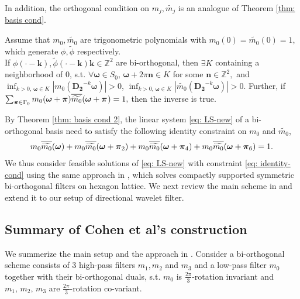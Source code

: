 In addition, the orthogonal condition on $m_j,\widetilde{m_j}$ is an analogue of Theorem \ref{thm: basis cond}.
\begin{thm}\label{thm: basis cond 2}
Assume that $m_0, \widetilde{m_0}$ are trigonometric polynomials with $m_0(0)=\widetilde{m_0}(0) = 1$, which generate $\phi,\widetilde{\phi}$ respectively.\\
If $\phi(\cdot - \boldsymbol{k}),\widetilde{\phi}(\cdot - \boldsymbol{k})\boldsymbol{k}\in\mathbb{Z}^2$ are bi-orthogonal, then $\exists K$ containing a neighborhood of 0, s.t. $\forall\boldsymbol{\omega}\in S_0,\,\boldsymbol{\omega}+2\pi\mathbf{n}\in K$ for some $\mathbf{n}\in\mathbb{Z}^2, $ and $\inf_{k>0,\,\boldsymbol{\omega}\in K}|m_0(\mathbf{D_2}^{-k}\boldsymbol{\omega})| >0$, $\inf_{k>0,\,\boldsymbol{\omega}\in K}|\widetilde{m_0}(\mathbf{D_2}^{-k}\boldsymbol{\omega})| >0$. 
 Further, if  $\sum_{\boldsymbol{\boldsymbol{\pi}}\in \Gamma_0} m_0(\boldsymbol{\omega}+\boldsymbol{\pi})\overline{\widetilde{m_{0}}}(\boldsymbol{\omega} + \boldsymbol{\pi}_{}) = 1,$ then the inverse is true.
\end{thm}
By Theorem \ref{thm: basis cond 2}, the linear system \eqref{eq: LS-new} of a bi-orthogonal basis need to satisfy the following identity constraint on $m_0$ and $\widetilde{m_0}$,
\begin{align}\label{eq: identity-cond}
m_0\overline{\widetilde{m_{0}}}(\boldsymbol{\omega}) + m_0\overline{\widetilde{m_{0}}}(\boldsymbol{\omega} + \boldsymbol{\pi}_{2}) + m_0\overline{\widetilde{m_{0}}}(\boldsymbol{\omega} + \boldsymbol{\pi}_{4}) + m_0\overline{\widetilde{m_{0}}}(\boldsymbol{\omega} + \boldsymbol{\pi}_{6}) = 1.
\end{align}
We thus consider feasible solutions of \eqref{eq: LS-new} with constraint \eqref{eq: identity-cond} using the same approach in \cite{cohen1993compactly}, which solves compactly supported symmetric bi-orthogonal filters on hexagon lattice. We next review the main scheme in \cite{cohen1993compactly} and extend it to our setup of directional wavelet filter.

\subsection{Summary of Cohen et al's construction}\label{subsec: cohen-summary}
We summerize the main setup and the approach in \cite{cohen1993compactly}. Consider a bi-orthogonal scheme consists of 3 high-pass filters $m_1,m_2$ and $m_3$ and a low-pass filter $m_0$ together with their bi-orthogonal duals, s.t.
$m_0$ is $\frac{2\pi}{3}$-rotation invariant and $m_1,\, m_2,\, m_3$ are $\frac{2\pi}{3}$-rotation co-variant.

